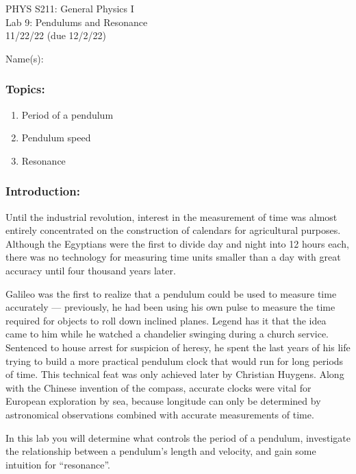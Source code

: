 \documentclass[11pt,letterpaper]{article}
\begin{document}
\setlength{\parindent}{0in}


\begin{flushright}
PHYS S211: General Physics I\\ 
Lab 9: Pendulums and Resonance\\
11/22/22 (due 12/2/22)
\end{flushright}

Name(s):\\

\subsubsection*{Topics:}
\begin{enumerate}
\setlength{\parskip}{3pt}
\item Period of a pendulum
\item Pendulum speed
\item Resonance
\end{enumerate}
 
\subsubsection*{Introduction:}
Until the industrial revolution, interest in the measurement of time was almost entirely concentrated on the construction of calendars for agricultural purposes.  Although the Egyptians were the first to divide day and night into 12 hours each, there was no technology for measuring time units smaller than a day with great accuracy until four thousand years later.

Galileo was the first to realize that a pendulum could be used to measure time accurately --- previously, he had been using his own pulse to measure the time required for objects
to roll down inclined planes.  Legend has it that the idea came to him while he watched a chandelier swinging during a church service.  Sentenced to house arrest for suspicion of
heresy, he spent the last years of his life trying to build a more practical pendulum clock that would run for long periods of time.  This technical feat was only achieved later by Christian Huygens.  Along with the Chinese invention of the compass, accurate clocks were vital for European exploration by sea, because longitude can only be determined by astronomical observations combined with accurate measurements of time.

In this lab you will determine what controls the period of a pendulum, investigate the relationship between a pendulum's length and velocity, and gain some intuition for ``resonance''.
\end{document}
